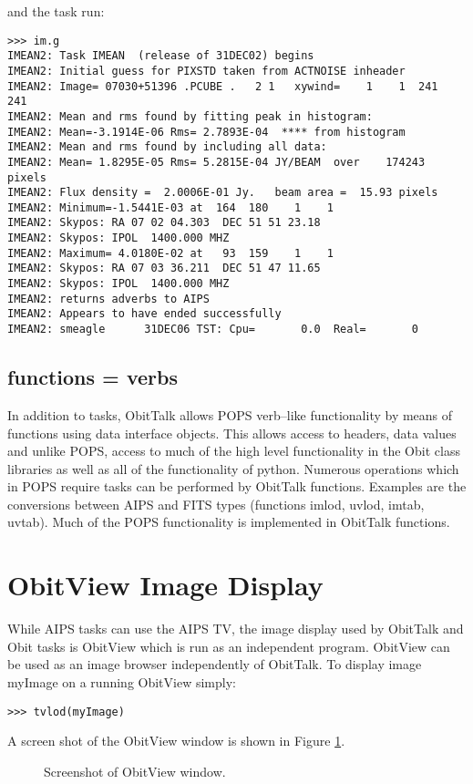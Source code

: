 \documentclass[11pt]{report}
\begin{document}
and the task run:
\begin{verbatim}
>>> im.g
IMEAN2: Task IMEAN  (release of 31DEC02) begins
IMEAN2: Initial guess for PIXSTD taken from ACTNOISE inheader
IMEAN2: Image= 07030+51396 .PCUBE .   2 1   xywind=    1    1  241  241
IMEAN2: Mean and rms found by fitting peak in histogram:
IMEAN2: Mean=-3.1914E-06 Rms= 2.7893E-04  **** from histogram
IMEAN2: Mean and rms found by including all data:
IMEAN2: Mean= 1.8295E-05 Rms= 5.2815E-04 JY/BEAM  over    174243 pixels
IMEAN2: Flux density =  2.0006E-01 Jy.   beam area =  15.93 pixels
IMEAN2: Minimum=-1.5441E-03 at  164  180    1    1
IMEAN2: Skypos: RA 07 02 04.303  DEC 51 51 23.18
IMEAN2: Skypos: IPOL  1400.000 MHZ
IMEAN2: Maximum= 4.0180E-02 at   93  159    1    1
IMEAN2: Skypos: RA 07 03 36.211  DEC 51 47 11.65
IMEAN2: Skypos: IPOL  1400.000 MHZ
IMEAN2: returns adverbs to AIPS
IMEAN2: Appears to have ended successfully
IMEAN2: smeagle      31DEC06 TST: Cpu=       0.0  Real=       0
\end{verbatim}

\subsection{functions = verbs}
In addition to tasks, ObitTalk allows POPS verb--like functionality by
means of functions using data interface objects.
This allows access to headers, data values and unlike POPS, access to
much of the high level functionality in the Obit class libraries as
well as all of the functionality of python.
Numerous operations which in POPS require tasks can be performed by
ObitTalk functions.  
Examples are the conversions between AIPS and FITS types (functions
imlod, uvlod, imtab, uvtab).
Much of the POPS functionality is implemented in ObitTalk functions.

\section{ObitView Image Display}
While AIPS tasks can use the AIPS TV, the image display used by
ObitTalk and Obit tasks is ObitView which is run as an independent
program. 
ObitView can be used as an image browser independently of ObitTalk.
To display image myImage on a running ObitView simply:
\begin{verbatim}
>>> tvlod(myImage)
\end{verbatim}

A screen shot of the ObitView window is shown in Figure \ref{ObitViewFig}.
\begin{figure}
\centerline{}
\caption{ 
Screenshot of ObitView window.
}
\label{ObitViewFig}
\end{figure}
\end{document}
